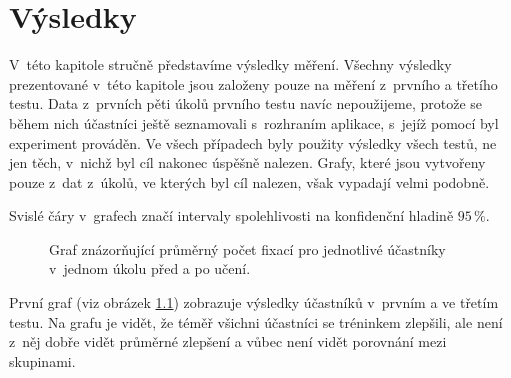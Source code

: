 \chapter{Výsledky}

V~této kapitole stručně představíme výsledky měření. Všechny výsledky
prezentované v~této kapitole jsou založeny pouze na měření z~prvního a třetího
testu. Data z~prvních pěti úkolů prvního testu navíc nepoužijeme, protože se
během nich účastníci ještě seznamovali s~rozhraním aplikace, s~jejíž pomocí byl
experiment prováděn. Ve všech případech byly použity výsledky všech testů, ne
jen těch, v~nichž byl cíl nakonec úspěšně nalezen. Grafy, které jsou vytvořeny
pouze z~dat z~úkolů, ve kterých byl cíl nalezen, však vypadají velmi podobně.

Svislé čáry v~grafech značí intervaly spolehlivosti na konfidenční hladině $95\,\%$.

\def\graphfigure#1#2#3{
\begin{figure}[h!]
\centering
\caption{#2}
\label{#3}
\end{figure}
}

\graphfigure{predpo_grid}{Graf znázorňující průměrný počet fixací pro jednotlivé účastníky v~jednom úkolu před a po učení.}{beforeall}

\long{}

První graf (viz obrázek \ref{beforeall}) zobrazuje výsledky účastníků v~prvním a ve třetím testu. Na grafu je vidět, že téměř všichni účastníci se tréninkem zlepšili, ale není z~něj dobře vidět průměrné zlepšení a vůbec není vidět porovnání mezi skupinami.


